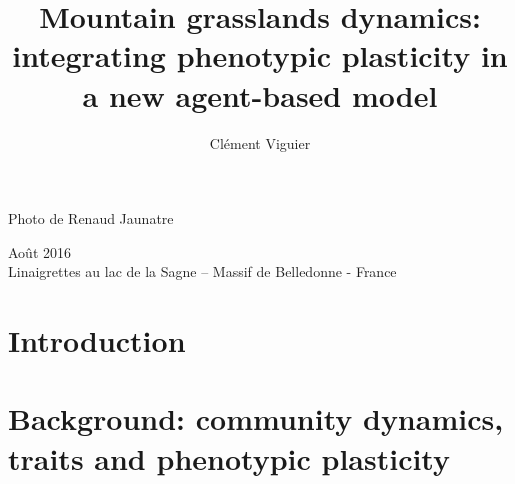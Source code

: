\documentclass[a4paper, notoc, justified,marginals=left, nobib]{tufte-book}
\title{Mountain grasslands dynamics: integrating phenotypic plasticity in a new agent-based model}
\author{Clément Viguier}
\makeatletter
\renewcommand\chapter{\thispagestyle{plain}%
\global\@topnum\z@
\@afterindentfalse
\secdef\@chapter\@schapter}
\newcommand{\fwnewthought}[1]{\begin{fullwidth}\newthought{#1}\end{fullwidth}}
\makeatother
\begin{document}


\vspace*{4cm}
\noindent Photo de Renaud Jaunatre


\vspace{1cm}
 Août 2016\\
\noindent Linaigrettes au lac de la Sagne – Massif de Belledonne - France


\cleardoublepage


\cleardoublepage


\begin{fullwidth}


\cleardoublepage

\tableofcontents

\end{fullwidth}



\part{Introduction}\label{part:introduction}
\begin{refsection}


\begin{fullwidth}
\printbibliography[heading=bibliography] 
\end{fullwidth}
\end{refsection}

\part{Background: community dynamics, traits and phenotypic plasticity}\label{part:literature}
\begin{refsection}
\setcounter{chapter}{0}



\begin{fullwidth}
\printbibliography[heading=bibliography] 
\end{fullwidth}
\end{refsection}
\end{document}

